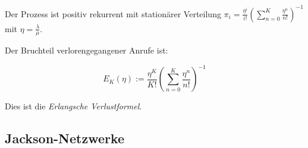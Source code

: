 Der Prozess ist positiv rekurrent mit stationärer Verteilung $\pi_i = \frac{\eta^i}{i!}\left(\sum_{n=0}^K \frac{\eta^n}{n!}\right)^{-1}$ mit $\eta = \frac{\lambda}{\mu}$.

Der Bruchteil verlorengegangener Anrufe ist:

\vspace*{-2mm}
$$E_K(\eta) := \frac{\eta^K}{K!} \left( \sum_{n=0}^K \frac{\eta^n}{n!} \right)^{-1}$$

Dies ist die \emph{Erlangsche Verlustformel}.

\subsection*{Jackson-Netzwerke}
